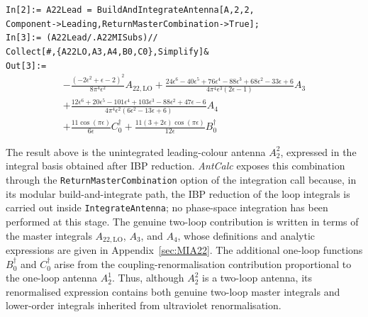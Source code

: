 \begin{mdframed}[backgroundcolor=gray!10, linewidth=0pt]
\texttt{In[2]:= A22Lead = BuildAndIntegrateAntenna[A,2,2,\\Component->Leading,ReturnMasterCombination->True];}\\
\texttt{In[3]:= (A22Lead/.A22MISubs)//\\Collect[\#,\{A22LO,A3,A4,B0,C0\},Simplify]\&}\\
\hfill
\texttt{Out[3]:=}
    \begin{equation*}
        \begin{gathered}
            -\frac{\left(-2\epsilon^2+\epsilon-2\right)^2}{8\pi^4\epsilon^2}A_{22,\text{LO}}
            +\frac{24\epsilon^6-40\epsilon^5+76\epsilon^4-88\epsilon^3+68\epsilon^2-33\epsilon+6}{4\pi^4\epsilon^3(2\epsilon-1)}A_3\\
            +\frac{12\epsilon^6+20\epsilon^5-101\epsilon^4+103\epsilon^3-88\epsilon^2+47\epsilon-6}{4\pi^4\epsilon^2\left(6\epsilon^2-13\epsilon+6\right)}A_4\\
            +\frac{11\cos(\pi\epsilon)}{6\epsilon}C_0^\dagger
            +\frac{11(3+2\epsilon)\cos(\pi\epsilon)}{12\epsilon}B_0^\dagger
        \end{gathered}
    \end{equation*}
\end{mdframed}

The result above is the unintegrated leading-colour antenna $A_2^2$, expressed in the integral basis
obtained after IBP reduction. \textit{AntCalc} exposes this combination through the
\texttt{ReturnMasterCombination} option of the integration call because, in its modular
build-and-integrate path, the IBP reduction of the loop integrals is carried out inside
\texttt{IntegrateAntenna}; no phase-space integration has been performed at this stage. The genuine
two-loop contribution is written in terms of the master integrals $A_{22,\mathrm{LO}}$, $A_3$, and
$A_4$, whose definitions and analytic expressions are given in Appendix~\ref{sec:MIA22}. The
additional one-loop functions $B_0^\dagger$ and $C_0^\dagger$ arise from the coupling-renormalisation
contribution proportional to the one-loop antenna $A_2^1$. Thus, although $A_2^2$ is a two-loop
antenna, its renormalised expression contains both genuine two-loop master integrals and lower-order
integrals inherited from ultraviolet renormalisation.

